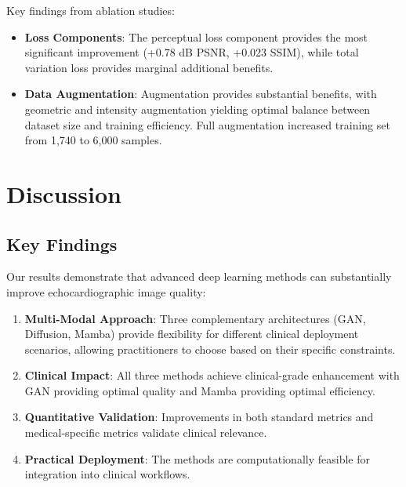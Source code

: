 \documentclass[10pt,conference,letterpaper]{IEEEtran}
\begin{document}
\begin{itemize}
Key findings from ablation studies:

\begin{itemize}
  \item \textbf{Loss Components}: The perceptual loss component provides the most significant improvement (+0.78 dB PSNR, +0.023 SSIM), while total variation loss provides marginal additional benefits.
  
  \item \textbf{Data Augmentation}: Augmentation provides substantial benefits, with geometric and intensity augmentation yielding optimal balance between dataset size and training efficiency. Full augmentation increased training set from 1,740 to 6,000 samples.
\end{itemize}

\section{Discussion}
\label{sec:discussion}

\subsection{Key Findings}

Our results demonstrate that advanced deep learning methods can substantially improve echocardiographic image quality:

\begin{enumerate}
  \item \textbf{Multi-Modal Approach}: Three complementary architectures (GAN, Diffusion, Mamba) provide flexibility for different clinical deployment scenarios, allowing practitioners to choose based on their specific constraints.
  
  \item \textbf{Clinical Impact}: All three methods achieve clinical-grade enhancement with GAN providing optimal quality and Mamba providing optimal efficiency.
  
  \item \textbf{Quantitative Validation}: Improvements in both standard metrics and medical-specific metrics validate clinical relevance.
  
  \item \textbf{Practical Deployment}: The methods are computationally feasible for integration into clinical workflows.
\end{enumerate}


\end{itemize}
\end{document}
